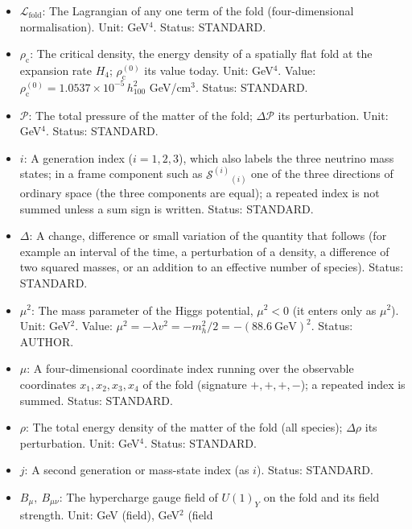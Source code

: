 \documentclass[
  10pt,
]{article}
\begin{document}
\begin{itemize}
  \(0.891\,\rho_{\mathrm{c}}^{(0)}\) for \(+\rho_{\mathrm{b}}\). Status:
  DERIVED (the condition and the values for each choice), ASSUMED (the
  pressure of the baryons along the extra times).
\item
  \(\mathcal{L}_{\mathrm{fold}}\): The Lagrangian of any one term of the
  fold (four-dimensional normalisation). Unit: GeV\(^4\). Status:
  STANDARD.
\item
  \(\rho_{\mathrm{c}}\): The critical density, the energy density of a
  spatially flat fold at the expansion rate \(H_4\);
  \(\rho_{\mathrm{c}}^{(0)}\) its value today. Unit: GeV\(^4\). Value:
  \(\rho_{\mathrm{c}}^{(0)} = 1.0537\times10^{-5}\,h_{100}^2\)
  GeV/cm\(^3\). Status: STANDARD.
\item
  \(\mathcal{P}\): The total pressure of the matter of the fold;
  \(\Delta\mathcal{P}\) its perturbation. Unit: GeV\(^4\). Status:
  STANDARD.
\item
  \(i\): A generation index (\(i = 1, 2, 3\)), which also labels the
  three neutrino mass states; in a frame component such as
  \(\mathcal{S}^{(i)}{}_{(i)}\) one of the three directions of ordinary
  space (the three components are equal); a repeated index is not summed
  unless a sum sign is written. Status: STANDARD.
\item
  \(\Delta\): A change, difference or small variation of the quantity
  that follows (for example an interval of the time, a perturbation of a
  density, a difference of two squared masses, or an addition to an
  effective number of species). Status: STANDARD.
\item
  \(\mu^2\): The mass parameter of the Higgs potential, \(\mu^2 < 0\)
  (it enters only as \(\mu^2\)). Unit: GeV\(^2\). Value:
  \(\mu^2 = -\lambda v^2 = -m_h^2/2 = -(88.6\ \mathrm{GeV})^2\). Status:
  AUTHOR.
\item
  \(\mu\): A four-dimensional coordinate index running over the
  observable coordinates \(x_1, x_2, x_3, x_4\) of the fold (signature
  \(+,+,+,-\)); a repeated index is summed. Status: STANDARD.
\item
  \(\rho\): The total energy density of the matter of the fold (all
  species); \(\Delta\rho\) its perturbation. Unit: GeV\(^4\). Status:
  STANDARD.
\item
  \(j\): A second generation or mass-state index (as \(i\)). Status:
  STANDARD.
\item
  \(B_\mu,\ B_{\mu\nu}\): The hypercharge gauge field of \(U(1)_Y\) on
  the fold and its field strength. Unit: GeV (field), GeV\(^2\) (field

\end{itemize}
\end{document}
